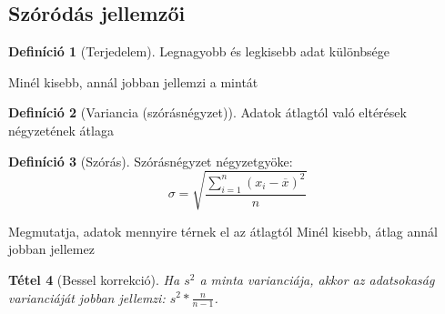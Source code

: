 \documentclass[twoside,12pt]{report}
\newtheorem{theorem}{Tétel}[section]
\theoremstyle{definition}
\newtheorem{definition}[theorem]{Definíció}
\begin{document}
	\subsection{Szóródás jellemzői}
	\begin{outline}
		\1[] \begin{definition}[Terjedelem]
				Legnagyobb és legkisebb adat különbsége
			\end{definition}
			\2 Minél kisebb, annál jobban jellemzi a mintát
		\1[] \begin{definition}[Variancia (szórásnégyzet)]
				Adatok átlagtól való eltérések négyzetének átlaga
			\end{definition}
		\1[] \begin{definition}[Szórás]
				Szórásnégyzet négyzetgyöke:
				\begin{equation*}
					\sigma=\sqrt{\frac{\sum_{i=1}^{n}\left(x_i-\overline{x}\right)^2}{n}}
				\end{equation*}
			\end{definition}
			\2 Megmutatja, adatok mennyire térnek el az átlagtól
			\2 Minél kisebb, átlag annál jobban jellemez
		\1[] 
		\begin{theorem}[Bessel korrekció]
			Ha $s^2$ a minta varianciája, akkor az adatsokaság varianciáját jobban jellemzi: $s^2*\frac{n}{n-1}$.
		\end{theorem}
	\end{outline}
\end{document}
